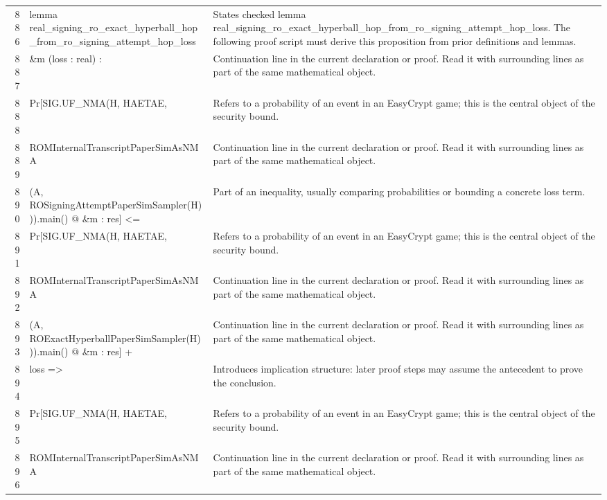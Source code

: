 \documentclass[10pt]{article}
\begin{document}
\begin{longtable}{r L{0.53\textwidth} L{0.37\textwidth}}
886 & {\ttfamily\scriptsize lemma real\_signing\_ro\_exact\_hyperball\_hop\_from\_ro\_signing\_attempt\_hop\_loss} & States checked lemma real\_signing\_ro\_exact\_hyperball\_hop\_from\_ro\_signing\_attempt\_hop\_loss.  The following proof script must derive this proposition from prior definitions and lemmas. \\
887 & {\ttfamily\scriptsize   \&m (loss : real) :} & Continuation line in the current declaration or proof.  Read it with surrounding lines as part of the same mathematical object. \\
888 & {\ttfamily\scriptsize   Pr[SIG.UF\_NMA(H, HAETAE,} & Refers to a probability of an event in an EasyCrypt game; this is the central object of the security bound. \\
889 & {\ttfamily\scriptsize        ROMInternalTranscriptPaperSimAsNMA} & Continuation line in the current declaration or proof.  Read it with surrounding lines as part of the same mathematical object. \\
890 & {\ttfamily\scriptsize          (A, ROSigningAttemptPaperSimSampler(H))).main() @ \&m : res] <=} & Part of an inequality, usually comparing probabilities or bounding a concrete loss term. \\
891 & {\ttfamily\scriptsize   Pr[SIG.UF\_NMA(H, HAETAE,} & Refers to a probability of an event in an EasyCrypt game; this is the central object of the security bound. \\
892 & {\ttfamily\scriptsize        ROMInternalTranscriptPaperSimAsNMA} & Continuation line in the current declaration or proof.  Read it with surrounding lines as part of the same mathematical object. \\
893 & {\ttfamily\scriptsize          (A, ROExactHyperballPaperSimSampler(H))).main() @ \&m : res] +} & Continuation line in the current declaration or proof.  Read it with surrounding lines as part of the same mathematical object. \\
894 & {\ttfamily\scriptsize     loss =>} & Introduces implication structure: later proof steps may assume the antecedent to prove the conclusion. \\
895 & {\ttfamily\scriptsize   Pr[SIG.UF\_NMA(H, HAETAE,} & Refers to a probability of an event in an EasyCrypt game; this is the central object of the security bound. \\
896 & {\ttfamily\scriptsize        ROMInternalTranscriptPaperSimAsNMA} & Continuation line in the current declaration or proof.  Read it with surrounding lines as part of the same mathematical object. \\

\end{longtable}
\end{document}
